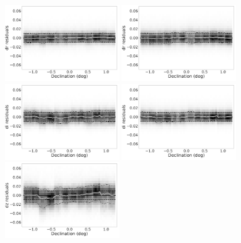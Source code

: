 \documentclass[fleqn,usenatbib]{mnras}
\begin{document}
\begin{figure}
    \centering\includegraphics[width=0.45\textwidth]{figures/colorResidDES42bright_dr_Dec_Hess_lr.png}
    \centering\includegraphics[width=0.45\textwidth]{figures/colorResidPSDR2v42bright_dr_Dec_Hess_lr.png}
    \centering\includegraphics[width=0.45\textwidth]{figures/colorResidDES42bright_di_Dec_Hess_lr.png}
    \centering\includegraphics[width=0.45\textwidth]{figures/colorResidPSDR2v42bright_di_Dec_Hess_lr.png}
    \centering\includegraphics[width=0.45\textwidth]{figures/colorResidDES42bright_dz_Dec_Hess_lr.png}

\end{figure}
\end{document}
